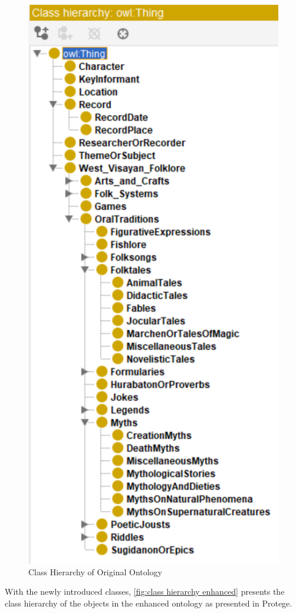 \begin{figure}[H]
    \centering
    \includegraphics[width=0.5\linewidth]{figures/Class Hierarchy of Original Ontology.png}
    \caption{Class Hierarchy of Original Ontology}
    \label{fig:class hierarchy}
\end{figure}

With the newly introduced classes, \ref{fig:class hierarchy enhanced} presents the class hierarchy of the objects in the enhanced ontology as presented in Protege.

